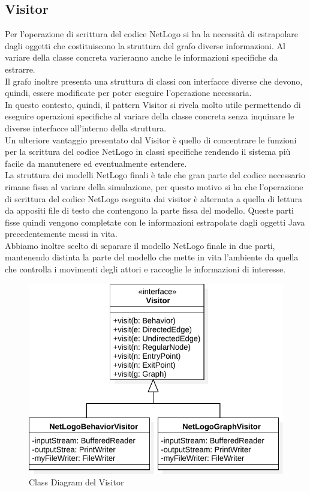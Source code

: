\subsection{Visitor}
Per l'operazione di scrittura del codice NetLogo si ha la necessità di estrapolare dagli oggetti che costituiscono la struttura del grafo diverse informazioni. Al variare della classe concreta varieranno anche le informazioni specifiche da estrarre.\\
Il grafo inoltre presenta una struttura di classi con interfacce diverse che devono, quindi, essere modificate per poter eseguire l'operazione necessaria.\\
In questo contesto, quindi, il pattern Visitor si rivela molto utile permettendo di eseguire operazioni specifiche al variare della classe concreta senza inquinare le diverse interfacce all'interno della struttura.\\
Un ulteriore vantaggio presentato dal Visitor è quello di concentrare le funzioni per la scrittura del codice NetLogo in classi specifiche rendendo il sistema più facile da manutenere ed eventualmente estendere.\\
La struttura dei modelli NetLogo finali è tale che gran parte del codice necessario rimane fissa al variare della simulazione, per questo motivo si ha che l'operazione di scrittura del codice NetLogo eseguita dai visitor è alternata a quella di lettura da appositi file di testo che contengono la parte fissa del modello. Queste parti fisse quindi vengono completate con le informazioni estrapolate dagli oggetti Java precedentemente messi in vita.\\
Abbiamo inoltre scelto di separare il modello NetLogo finale in due parti, mantenendo distinta la parte del modello che mette in vita l'ambiente da quella che controlla i movimenti degli attori e raccoglie le informazioni di interesse.\\
\begin{figure}[htb]
\centering
\includegraphics[width=\textwidth,height=\textheight,keepaspectratio]{images/visitor-class-diagram.pdf}
\caption{Class Diagram del Visitor}
\label{fig:visitor-diagram}
\end{figure}
